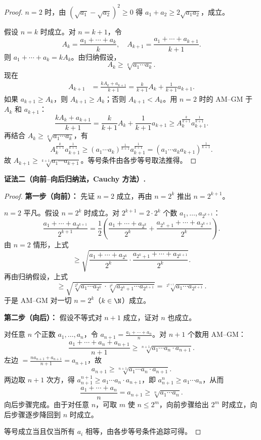 \begin{proof}
	$n=2$ 时，由 $(\sqrt{a_1} - \sqrt{a_2})^2 \geqslant 0$ 得 $a_1 + a_2 \geqslant 2\sqrt{a_1a_2}$，成立。
	
	假设 $n=k$ 时成立。对 $n=k+1$，令
	\[
	A_k = \frac{a_1 + \cdots + a_k}{k}, \quad A_{k+1} = \frac{a_1 + \cdots + a_{k+1}}{k+1}.
	\]
	则 $a_1 + \cdots + a_k = kA_k$。由归纳假设，
	\[
	A_k \geqslant \sqrt[k]{a_1 \cdots a_k}.
	\]
	现在
	\[
	\begin{aligned}
	A_{k+1} &= \frac{kA_k + a_{k+1}}{k+1}
	= \frac{k}{k+1}A_k + \frac{1}{k+1}a_{k+1}.
	\end{aligned}
	\]
	如果 $a_{k+1} \geqslant A_k$，则 $A_{k+1} \geqslant A_k$；否则 $A_{k+1} < A_k$。用 $n=2$ 时的 AM--GM 于 $A_k$ 和 $a_{k+1}$：
	\[
	\frac{kA_k + a_{k+1}}{k+1} = \frac{k}{k+1}A_k + \frac{1}{k+1}a_{k+1}
	\geqslant A_k^{\frac{k}{k+1}} a_{k+1}^{\frac{1}{k+1}}.
	\]
	再结合 $A_k \geqslant \sqrt[k]{a_1\cdots a_k}$，有
	\[
	A_k^{\frac{k}{k+1}} a_{k+1}^{\frac{1}{k+1}}
	\geqslant (a_1\cdots a_k)^{\frac{1}{k+1}} a_{k+1}^{\frac{1}{k+1}}
	= (a_1\cdots a_k a_{k+1})^{\frac{1}{k+1}}.
	\]
	故 $A_{k+1} \geqslant \sqrt[k+1]{a_1\cdots a_{k+1}}$。等号条件由各步等号取法推得。
\end{proof}

\medskip
\noindent\textbf{证法二（向前--向后归纳法，Cauchy 方法）.}

\begin{proof}
	\textbf{第一步（向前）：} 先证 $n=2$ 成立，再由 $n=2^k$ 推出 $n=2^{k+1}$。
	
	$n=2$ 平凡。假设 $n=2^k$ 时成立。对 $2^{k+1}=2\cdot 2^k$ 个数 $a_1,\dots,a_{2^{k+1}}$：
	\[
	\frac{a_1+\cdots+a_{2^{k+1}}}{2^{k+1}}
	= \frac{1}{2}\left(\frac{a_1+\cdots+a_{2^k}}{2^k} + \frac{a_{2^k+1}+\cdots+a_{2^{k+1}}}{2^k}\right).
	\]
	由 $n=2$ 情形，上式
	\[
	\geqslant \sqrt{\frac{a_1+\cdots+a_{2^k}}{2^k} \cdot \frac{a_{2^k+1}+\cdots+a_{2^{k+1}}}{2^k}}.
	\]
	再由归纳假设，上式
	\[
	\geqslant \sqrt{\sqrt[2^k]{a_1\cdots a_{2^k}} \cdot \sqrt[2^k]{a_{2^k+1}\cdots a_{2^{k+1}}}}
	= \sqrt[2^{k+1}]{a_1\cdots a_{2^{k+1}}}.
	\]
	于是 AM--GM 对一切 $n=2^k$（$k \in \N$）成立。
	
	\textbf{第二步（向后）：} 假设不等式对 $n+1$ 成立，证对 $n$ 也成立。
	
	对任意 $n$ 个正数 $a_1,\dots,a_n$，令 $a_{n+1} = \frac{a_1+\cdots+a_n}{n}$。对 $n+1$ 个数用 AM--GM：
	\[
	\frac{a_1+\cdots+a_n + a_{n+1}}{n+1}
	\geqslant \sqrt[n+1]{a_1\cdots a_n \cdot a_{n+1}}.
	\]
	左边 $= \frac{n a_{n+1} + a_{n+1}}{n+1} = a_{n+1}$，故
	\[
	a_{n+1} \geqslant \sqrt[n+1]{a_1\cdots a_n \cdot a_{n+1}}.
	\]
	两边取 $n+1$ 次方，得 $a_{n+1}^{n+1} \geqslant a_1\cdots a_n \cdot a_{n+1}$，即 $a_{n+1}^n \geqslant a_1\cdots a_n$，从而
	\[
	\frac{a_1+\cdots+a_n}{n} = a_{n+1} \geqslant \sqrt[n]{a_1\cdots a_n}.
	\]
	向后步骤完成。由于对任意 $n$，可取 $m$ 使 $n \leqslant 2^m$，向前步骤给出 $2^m$ 时成立，向后步骤逐步降回到 $n$ 时成立。
	
	等号成立当且仅当所有 $a_i$ 相等，由各步等号条件追踪可得。
\end{proof}




